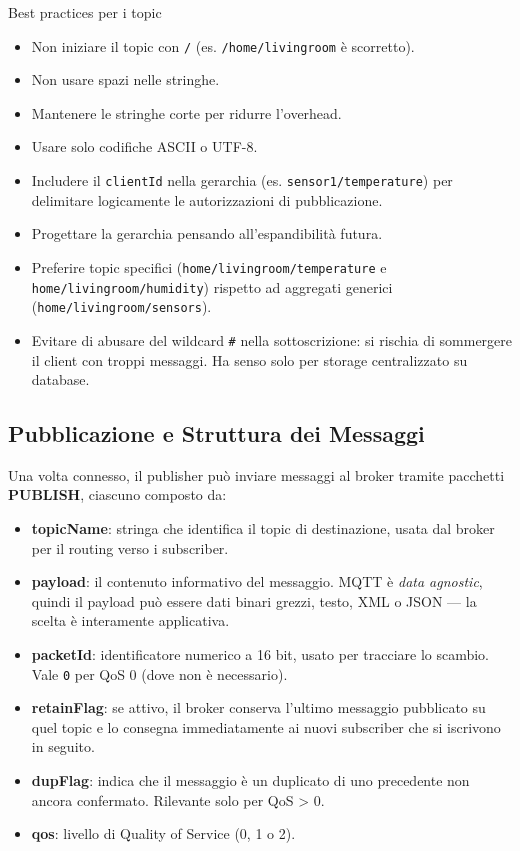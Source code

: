 \documentclass[
  italian,
  openany]{book}
\providecommand{\tightlist}{%
  \setlength{\itemsep}{0pt}\setlength{\parskip}{0pt}}
\begin{document}
\begin{calloutwarning}{Best practices per i topic}

\begin{itemize}
\tightlist
\item
  Non iniziare il topic con \texttt{/} (es. \texttt{/home/livingroom} è
  scorretto).
\item
  Non usare spazi nelle stringhe.
\item
  Mantenere le stringhe corte per ridurre l'overhead.
\item
  Usare solo codifiche ASCII o UTF-8.
\item
  Includere il \texttt{clientId} nella gerarchia (es.
  \texttt{sensor1/temperature}) per delimitare logicamente le
  autorizzazioni di pubblicazione.
\item
  Progettare la gerarchia pensando all'espandibilità futura.
\item
  Preferire topic specifici (\texttt{home/livingroom/temperature} e
  \texttt{home/livingroom/humidity}) rispetto ad aggregati generici
  (\texttt{home/livingroom/sensors}).
\item
  Evitare di abusare del wildcard \texttt{\#} nella sottoscrizione: si
  rischia di sommergere il client con troppi messaggi. Ha senso solo per
  storage centralizzato su database.
\end{itemize}

\end{calloutwarning}

\subsection{Pubblicazione e Struttura dei
Messaggi}\label{pubblicazione-e-struttura-dei-messaggi}

Una volta connesso, il publisher può inviare messaggi al broker tramite
pacchetti \textbf{PUBLISH}, ciascuno composto da:

\begin{itemize}
\tightlist
\item
  \textbf{topicName}: stringa che identifica il topic di destinazione,
  usata dal broker per il routing verso i subscriber.
\item
  \textbf{payload}: il contenuto informativo del messaggio. MQTT è
  \emph{data agnostic}, quindi il payload può essere dati binari grezzi,
  testo, XML o JSON --- la scelta è interamente applicativa.
\item
  \textbf{packetId}: identificatore numerico a 16 bit, usato per
  tracciare lo scambio. Vale \texttt{0} per QoS 0 (dove non è
  necessario).
\item
  \textbf{retainFlag}: se attivo, il broker conserva l'ultimo messaggio
  pubblicato su quel topic e lo consegna immediatamente ai nuovi
  subscriber che si iscrivono in seguito.
\item
  \textbf{dupFlag}: indica che il messaggio è un duplicato di uno
  precedente non ancora confermato. Rilevante solo per QoS
  \textgreater{} 0.
\item
  \textbf{qos}: livello di Quality of Service (0, 1 o 2).
\end{itemize}
\end{document}
